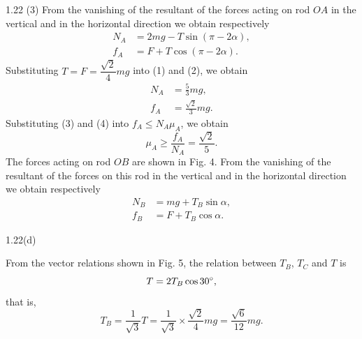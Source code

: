 \begin{solution}{1.22}
(3) From the vanishing of the resultant of the forces acting on rod $OA$ in the vertical and in the horizontal direction we obtain respectively
\begin{align}
N_A&=2mg-T\sin(\pi-2\alpha), \tag{1}\\
f_A&=F+T\cos(\pi-2\alpha). \tag{2}
\end{align}
Substituting $T=F=\dfrac{\sqrt{2}}{4}mg$ into (1) and (2), we obtain
\begin{align}
N_A&=\frac{5}{3}mg, \tag{3}\\
f_A&=\frac{\sqrt{2}}{3}mg. \tag{4}
\end{align}
Substituting (3) and (4) into $f_A\leq N_A\mu_A$, we obtain
\begin{equation}
\mu_A\geq\frac{f_A}{N_A}=\frac{\sqrt{2}}{5}. \tag{5}
\end{equation}
The forces acting on rod $OB$ are shown in Fig. 4. From the vanishing of the resultant of the forces on this rod in the vertical and in the horizontal direction we obtain respectively
\begin{align}
N_B&=mg+T_B\sin\alpha, \tag{6}\\
f_B&=F+T_B\cos\alpha. \tag{7}
\end{align}

\begin{figbox}{1.22(d)}
\end{figbox}

From the vector relations shown in Fig. 5, the relation between $T_B$, $T_C$ and $T$ is
\[
T=2T_B\cos 30^{\circ},
\]
that is,
\begin{equation}
T_B=\frac{1}{\sqrt{3}}T=\frac{1}{\sqrt{3}}\times\frac{\sqrt{2}}{4}mg=\frac{\sqrt{6}}{12}mg. \tag{8}
\end{equation}


\end{solution}
